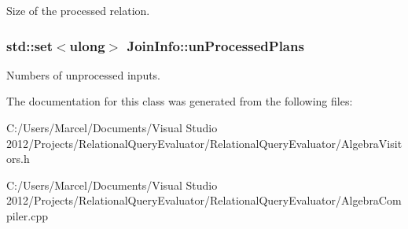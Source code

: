 Size of the processed relation. \hypertarget{class_join_info_ac6d0b302590c265ce7f3c47db28bad44}{
\subsubsection[{un\+Processed\+Plans}]{\setlength{\rightskip}{0pt plus 5cm}std\+::set$<$ulong$>$ Join\+Info\+::un\+Processed\+Plans}}\label{class_join_info_ac6d0b302590c265ce7f3c47db28bad44}
Numbers of unprocessed inputs. 

The documentation for this class was generated from the following files\+:\begin{DoxyCompactItemize}
\item 
C\+:/\+Users/\+Marcel/\+Documents/\+Visual Studio 2012/\+Projects/\+Relational\+Query\+Evaluator/\+Relational\+Query\+Evaluator/Algebra\+Visitors.\+h\item 
C\+:/\+Users/\+Marcel/\+Documents/\+Visual Studio 2012/\+Projects/\+Relational\+Query\+Evaluator/\+Relational\+Query\+Evaluator/Algebra\+Compiler.\+cpp\end{DoxyCompactItemize}
